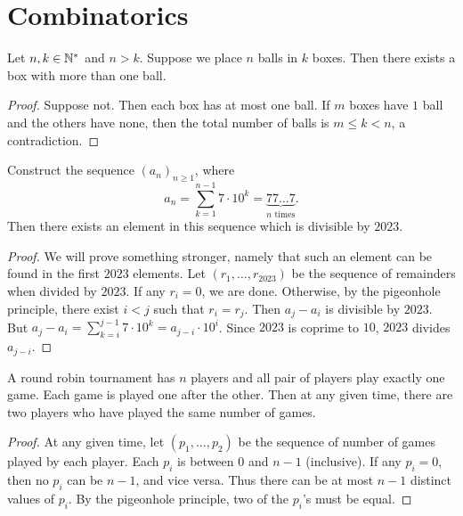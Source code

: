 \chapter{Combinatorics}

\begin{theorem*} \label{thm:php}
    Let $n, k \in \mathbb{N}^*$ and $n > k$.
    Suppose we place $n$ balls in $k$ boxes.
    Then there exists a box with more than one ball.
\end{theorem*}
\begin{proof}
    Suppose not.
    Then each box has at most one ball.
    If $m$ boxes have $1$ ball and the others have none,
    then the total number of balls is $m \le k < n$, a contradiction.
\end{proof}

\begin{example}
    Construct the sequence $(a_n)_{n \ge 1}$, where \[
        a_n = \sum_{k=1}^{n-1} 7 \cdot 10^k
            = \underbrace{77\dots7}_{n \text{ times}}.
    \] Then there exists an element in this sequence which is divisible by
    $2023$.
\end{example}
\begin{proof}
    We will prove something stronger, namely that such an element can be
    found in the first $2023$ elements.
    Let $(r_1, \dots, r_{2023})$ be the sequence of remainders when divided
    by $2023$.
    If any $r_i = 0$, we are done.
    Otherwise, by the pigeonhole principle, there exist $i < j$ such that
    $r_i = r_j$.
    Then $a_j - a_i$ is divisible by $2023$.
    But $a_j - a_i = \sum_{k=i}^{j-1} 7 \cdot 10^k = a_{j-i} \cdot 10^i$.
    Since $2023$ is coprime to $10$, $2023$ divides $a_{j-i}$.
\end{proof}

\begin{example}
    A round robin tournament has $n$ players and all pair of players play
    exactly one game.
    Each game is played one after the other.
    Then at any given time, there are two players who have played the same
    number of games.
\end{example}
\begin{proof}
    At any given time, let $(p_1, \dots, p_2)$ be the sequence of number of
    games played by each player.
    Each $p_i$ is between $0$ and $n-1$ (inclusive).
    If any $p_i = 0$, then no $p_i$ can be $n-1$, and vice versa.
    Thus there can be at most $n-1$ distinct values of $p_i$.
    By the pigeonhole principle, two of the $p_i$'s must be equal.
\end{proof}


